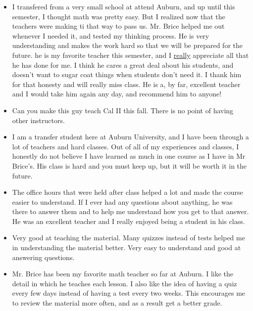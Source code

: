 \documentclass[11pt]{article}
\begin{document}
	
	\begin{itemize}
	
		\item{}
      I transfered from a very small school at attend Auburn,
      and up until this semester, I thought math was pretty easy.
      But I realized now that the teachers were making ti that way to
      pass us.
      Mr. Brice helped me out whenever I needed it, and tested my
      thinking process.
      He is very understanding and makes the work hard so that we will
      be prepared for the future.
      he is my favorite teacher this semester, and I \underline{really}
      appreciate all that he has done for me.
      I think he cares a great deal about his students, and doesn't want
      to sugar coat things when students don't need it.
      I thank him for that honesty and will really miss class.
      He is a, by far, excellent teacher and I would take him again any
      day, and recommend him to anyone!
		
		\item{}
      Can you make this guy teach Cal II this fall. There is no point of
      having other instructors.
		
		\item{}
      I am a transfer student here at Auburn University,
      and I have been through a lot of teachers and hard classes.
      Out of all of my experiences and classes,
      I honestly do not believe I have learned as much in one course as
      I have in Mr Brice's.
      His class is hard and you must keep up, but it will be worth it in
      the future.
	\end{itemize}
	
	\begin{itemize}
	
		\item{}
      The office hours that were held after class helped a lot and made
      the course easier to understand.
      If I ever had any questions about anything,
      he was there to answer them and to help me understand how you get
      to that answer.
      He was an excellent teacher and I really enjoyed being a student
      in his class.
		
		\item{}
      Very good at teaching the material.
      Many quizzes instead of tests helped me in understanding the
      material better.
      Very easy to understand and good at answering questions.
		
		\item{}
      Mr. Brice has been my favorite math teacher so far at Auburn.
      I like the detail in which he teaches each lesson.
      I also like the idea of having a quiz every few days instead of
      having a test every two weeks.
      This encourages me to review the material more often,
      and as a result get a better grade.
	\end{itemize}
	
\end{document}
